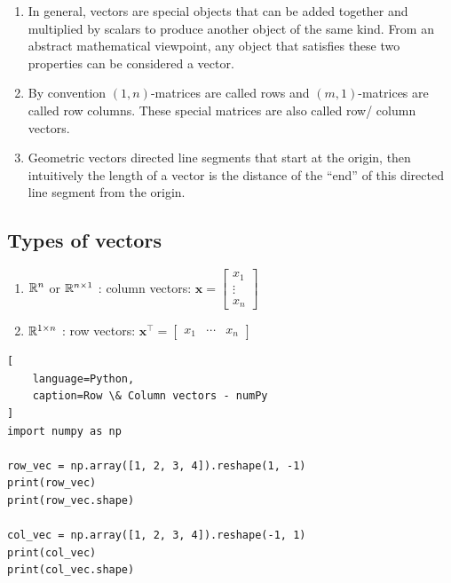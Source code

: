 \begin{enumerate}
    \item In general, vectors are special objects that can be added together and multiplied by scalars to produce another object of the same kind. From an abstract mathematical viewpoint, any object that satisfies these two properties can be considered a vector. 
    \hfill \cite{mfml/book/mml/Deisenroth-Faisal-Ong}

    \item By convention $(1, n)$-matrices are called rows and $(m, 1)$-matrices are called row columns. 
    These special matrices are also called row/ column vectors.
    \hfill \cite{mfml/book/mml/Deisenroth-Faisal-Ong}

    \item Geometric vectors directed line segments that start at the origin, then intuitively the length of a vector is the distance of the “end” of this directed line segment from the origin.
    \hfill \cite{mfml/book/mml/Deisenroth-Faisal-Ong}
\end{enumerate}




\subsection{Types of vectors}

\begin{enumerate}
    \item $\mathbb{R}^n$ or $\mathbb{R}^{n\times 1}$ : column vectors: 
    $
        \bm{x} = 
        \begin{bmatrix}
            x_1\\ \vdots \\ x_n
        \end{bmatrix}
    $
    \hfill \cite{mfml/book/mml/Deisenroth-Faisal-Ong}

    \item $\mathbb{R}^{1\times n}$ : row vectors: 
    $
        \bm{x}^\top = \begin{bmatrix}x_1 & \cdots & x_n\end{bmatrix}
    $
    \hfill \cite{mfml/book/mml/Deisenroth-Faisal-Ong}
\end{enumerate}


\begin{lstlisting}[
    language=Python,
    caption=Row \& Column vectors - numPy
]
import numpy as np

row_vec = np.array([1, 2, 3, 4]).reshape(1, -1)
print(row_vec)
print(row_vec.shape)

col_vec = np.array([1, 2, 3, 4]).reshape(-1, 1)
print(col_vec)
print(col_vec.shape)
\end{lstlisting}


